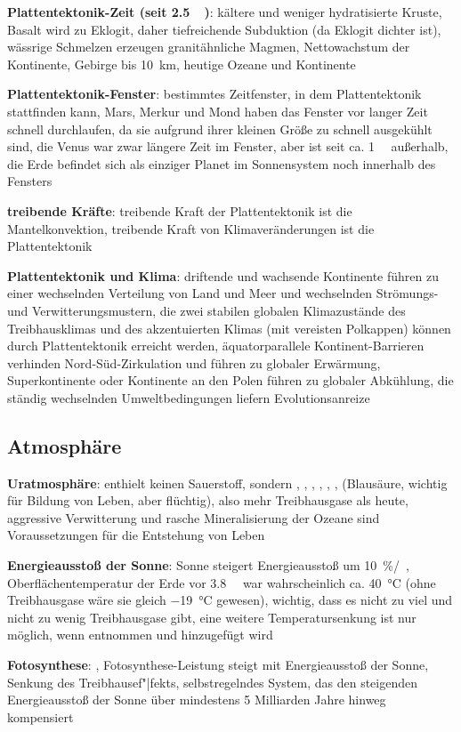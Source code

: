 \textbf{Plattentektonik-Zeit (seit \SI{2.5}{\giga\year})}:
kältere und weniger hydratisierte Kruste,
Basalt wird zu Eklogit, daher tiefreichende Subduktion (da Eklogit dichter ist),
wässrige Schmelzen erzeugen granitähnliche Magmen,
Nettowachstum der Kontinente,
Gebirge bis \SI{10}{\kilo\meter},
heutige Ozeane und Kontinente

\textbf{Plattentektonik-Fenster}:
bestimmtes Zeitfenster, in dem Plattentektonik stattfinden kann,
Mars, Merkur und Mond haben das Fenster vor langer Zeit schnell durchlaufen,
da sie aufgrund ihrer kleinen Größe zu schnell ausgekühlt sind,
die Venus war zwar längere Zeit im Fenster, aber ist seit ca. \SI{1}{\giga\year} außerhalb,
die Erde befindet sich als einziger Planet im Sonnensystem noch innerhalb des Fensters

\textbf{treibende Kräfte}:
treibende Kraft der Plattentektonik ist die Mantelkonvektion,
treibende Kraft von Klimaveränderungen ist die Plattentektonik

\textbf{Plattentektonik und Klima}:
driftende und wachsende Kontinente führen zu einer wechselnden Verteilung von Land und Meer und
wechselnden Strömungs- und Verwitterungsmustern,
die zwei stabilen globalen Klimazustände des Treibhausklimas und des akzentuierten Klimas
(mit vereisten Polkappen) können durch Plattentektonik erreicht werden,
äquatorparallele Kontinent-Barrieren verhinden Nord-Süd-Zirkulation und führen zu globaler
Erwärmung,
Superkontinente oder Kontinente an den Polen führen zu globaler Abkühlung,
die ständig wechselnden Umweltbedingungen liefern Evolutionsanreize

\subsection{%
    Atmosphäre%
}

\textbf{Uratmosphäre}:
enthielt keinen Sauerstoff, sondern , , , , ,
,  (Blausäure, wichtig für Bildung von Leben, aber flüchtig),
also mehr Treibhausgase als heute,
aggressive Verwitterung und rasche Mineralisierung der Ozeane sind Voraussetzungen für die
Entstehung von Leben

\textbf{Energieausstoß der Sonne}:
Sonne steigert Energieausstoß um \SI{10}{\percent/\giga\year},
Oberflächentemperatur der Erde vor \SI{3.8}{\giga\year} war wahrscheinlich ca.
\SI{40}{\celsius} (ohne Treibhausgase wäre sie gleich \SI{-19}{\celsius} gewesen),
wichtig, dass es nicht zu viel und nicht zu wenig Treibhausgase gibt,
eine weitere Temperatursenkung ist nur möglich, wenn  entnommen und 
hinzugefügt wird

\textbf{Fotosynthese}:
,
Fotosynthese-Leistung steigt mit Energieausstoß der Sonne,
Senkung des Treibhausef"|fekts,
selbstregelndes System, das den steigenden Energieausstoß der Sonne über mindestens
5 Milliarden Jahre hinweg kompensiert

\pagebreak
